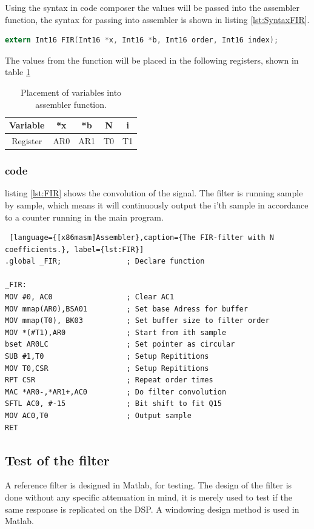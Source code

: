 Using the syntax in code composer the values will be passed into the assembler function, the syntax for passing into assembler is shown in listing \ref{lst:SyntaxFIR}.
\begin{lstlisting}[language={C},caption={Function prototype.}, label={lst:SyntaxFIR}]
extern Int16 FIR(Int16 *x, Int16 *b, Int16 order, Int16 index);
\end{lstlisting}
The values from the function will be placed in the following registers, shown in table \ref{tab:Assemblerpassing}

\begin{table}[H]
	\centering
	\begin{tabular}{c|cccc}
		Variable & *x & *b & N & i \\ \hline
		Register & AR0 & AR1 & T0 & T1
	\end{tabular} 
	\caption{Placement of variables into assembler function.}
	\label{tab:Assemblerpassing}
\end{table}


\subsubsection{code}
listing \ref{lst:FIR} shows the convolution of the signal. The filter is running sample by sample, which means it will continuously output the i'th sample in accordance to a counter running in the main program.  
\begin{lstlisting} [language={[x86masm]Assembler},caption={The FIR-filter with N coefficients.}, label={lst:FIR}]
.global _FIR;				; Declare function 

_FIR:	
MOV #0, AC0					; Clear AC1
MOV mmap(AR0),BSA01			; Set base Adress for buffer
MOV mmap(T0), BK03			; Set buffer size to filter order
MOV *(#T1),AR0				; Start from ith sample
bset AR0LC					; Set pointer as circular
SUB #1,T0					; Setup Repititions
MOV T0,CSR					; Setup Repititions
RPT CSR						; Repeat order times
MAC *AR0-,*AR1+,AC0 		; Do filter convolution
SFTL AC0, #-15				; Bit shift to fit Q15
MOV AC0,T0					; Output sample
RET
\end{lstlisting}



\subsection{Test of the filter}
A reference filter is designed in Matlab, for testing. The design of the filter is done without any specific attenuation in mind, it is merely used to test if the same response is replicated on the DSP. A windowing design method is used in Matlab.

